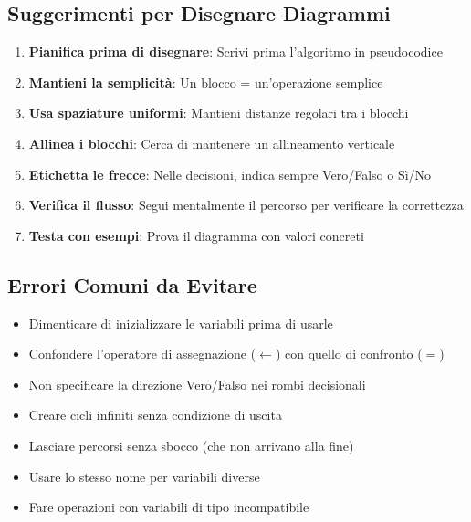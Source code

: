 \documentclass[a4paper,16pt]{article}
\begin{document}
\subsection{Suggerimenti per Disegnare Diagrammi}

\begin{enumerate}[leftmargin=*]
    \item \textbf{Pianifica prima di disegnare}: Scrivi prima l'algoritmo in pseudocodice
    \item \textbf{Mantieni la semplicità}: Un blocco = un'operazione semplice
    \item \textbf{Usa spaziature uniformi}: Mantieni distanze regolari tra i blocchi
    \item \textbf{Allinea i blocchi}: Cerca di mantenere un allineamento verticale
    \item \textbf{Etichetta le frecce}: Nelle decisioni, indica sempre Vero/Falso o Sì/No
    \item \textbf{Verifica il flusso}: Segui mentalmente il percorso per verificare la correttezza
    \item \textbf{Testa con esempi}: Prova il diagramma con valori concreti
\end{enumerate}

\subsection{Errori Comuni da Evitare}

\begin{itemize}[leftmargin=*]
    \item Dimenticare di inizializzare le variabili prima di usarle
    \item Confondere l'operatore di assegnazione ($\leftarrow$) con quello di confronto ($=$)
    \item Non specificare la direzione Vero/Falso nei rombi decisionali
    \item Creare cicli infiniti senza condizione di uscita
    \item Lasciare percorsi senza sbocco (che non arrivano alla fine)
    \item Usare lo stesso nome per variabili diverse
    \item Fare operazioni con variabili di tipo incompatibile
\end{itemize}
\end{document}

